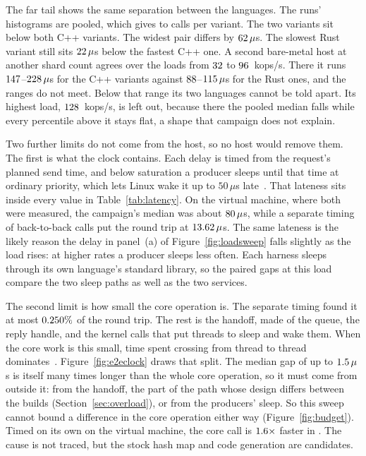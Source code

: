\documentclass[english,oneside,a4paper,censored,csm,software-track-2020]{HYthesisML}
\begin{document}
The far tail shows the same separation between the languages.
The runs' histograms are pooled, which
gives \FarTailSamplesMin{} to \FarTailSamplesMax{} calls per variant. The
two \FarTailLower{} variants sit below both C++ variants. The widest pair
differs by $62\,\mu$s. The slowest Rust variant still sits
$22\,\mu$s below the fastest C++ one. A second bare-metal host at another
shard count agrees over the loads from $32$ to $96$~kops/s.
There it runs $147$--$228\,\mu$s for the C++ variants against
$88$--$115\,\mu$s for the Rust ones, and the ranges do not
meet. Below that range its two languages cannot be told apart. Its highest load,
$128$~kops/s, is left out, because there the pooled median falls while every
percentile above it stays flat, a shape that campaign does not explain.

Two further limits do not come from the host, so no host would remove them. The first is
what the clock contains. Each delay is timed from the request's planned send time, and
below saturation a producer sleeps until that time at ordinary priority, which lets Linux
wake it up to $50\,\mu$s late~\cite{linux2026timerslack}. That lateness sits inside every
value in Table~\ref{tab:latency}. On the virtual machine, where both were measured, the
campaign's median was about $80\,\mu$s, while a separate timing of back-to-back
calls put the round trip at $13.62\,\mu$s. The same lateness is the likely reason
the delay in panel~(a) of Figure~\ref{fig:loadsweep} falls slightly as the load rises: at
higher rates a producer sleeps less often. Each harness sleeps through its own language's
standard library, so the paired gaps at this load compare the two sleep paths as well as the
two services.

The second limit is how small the core operation is. The separate timing found it at most
$0.250\%$ of the round trip. The rest is the handoff, made of the queue, the
reply handle, and the kernel calls that put threads to sleep and wake them. When the core
work is this small, time spent crossing from thread to thread
dominates~\cite{zhou2025oltp}. Figure~\ref{fig:e2eclock} draws that split. The median gap
of up to $1.5\,\mu$s is itself many times longer than the whole core
operation, so it must come from outside it: from the handoff, the part of the path whose
design differs between the builds (Section~\ref{sec:overload}), or from the producers'
sleep. So this sweep cannot bound a difference in the core operation either way
(Figure~\ref{fig:budget}). Timed on its own on the virtual machine, the core call is
$1.6\times$ faster in \BudgetCoreFaster{}. The cause is not traced, but the
stock hash map and code generation are candidates.
\end{document}
